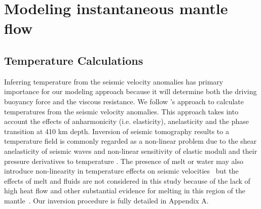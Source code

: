 \documentclass[draft,linenumbers]{agujournal2018}
\begin{document}
\section{Modeling instantaneous mantle flow}
    
\subsection{Temperature Calculations} \label{temp_var}
    Inferring temperature from the seismic velocity anomalies has primary importance for our modeling approach because it will determine both the driving buoyancy force and the viscous resistance. We follow \citet{Cammarano2003}'s approach to calculate temperatures from the seismic velocity anomalies. This approach takes into account the effects of anharmonicity (i.e. elasticity), anelasticity and the phase transition at 410 km depth. Inversion of seismic tomography results to a temperature field is commonly regarded as a non-linear problem due to the shear anelasticity of seismic waves \citep{minster1981model, karato1993importance, sobolev1996upper, Goes_2000, artemieva2004shear} and non-linear sensitivity of elastic moduli and their pressure derivatives to temperature \citep{duffy1989seismic, anderson1992high, Cammarano2003, stixrude2005thermodynamics}. The presence of melt or water may also introduce non-linearity in temperature effects on seismic velocities~\citep{Karato_1998} but the effects of melt and fluids are not considered in this study because of the lack of high heat flow and other substantial evidence for melting in this region of the mantle~\citep{blackwell2006assessment}. Our inversion procedure is fully detailed in Appendix A.
%
    
\end{document}
